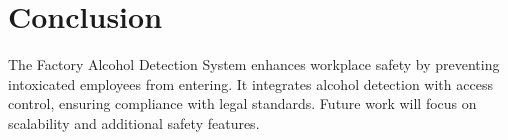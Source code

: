 \documentclass[12pt]{article}
\begin{document}
    \section{Conclusion}
    \label{sec:conclusion}
    The Factory Alcohol Detection System enhances  workplace safety by preventing intoxicated employees from entering. It integrates alcohol detection with access control, ensuring compliance with legal standards. Future work will focus on scalability and additional safety features.

    \appendix
    

    
    

\end{document}
